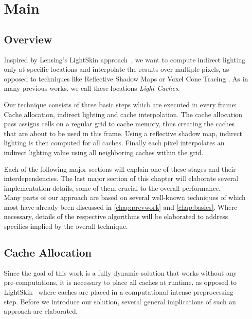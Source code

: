 \documentclass[thesis.tex]{subfiles}
\begin{document}
\chapter{Main}\label{chap:basics}

\section{Overview}
Inspired by Lensing's LightSkin approach~\cite{bib:LightskinPaper}, we want to compute indirect lighting only at specific locations and interpolate the results over multiple pixels, as opposed to techniques like Reflective Shadow Maps or Voxel Cone Tracing .
As in many previous works, we call these locations \emph{Light Caches}.

Our technique consists of three basic steps which are executed in every frame: Cache allocation, indirect lighting and cache interpolation.
The cache allocation pass assigns cells on a regular grid to cache memory, thus creating the caches that are about to be used in this frame.
Using a reflective shadow map, indirect lighting is then computed for all caches.
Finally each pixel interpolates an indirect lighting value using all neighboring caches within the grid.

Each of the following major sections will explain one of these stages and their interdependencies.
The last major section of this chapter will elaborate several implementation details, some of them crucial to the overall performance.\\
Many parts of our approach are based on several well-known techniques of which most have already been discussed in \autoref{chap:prevwork} and \autoref{chap:basics}.
Where necessary, details of the respective algorithms will be elaborated to address specifics implied by the overall technique.

\section{Cache Allocation}
Since the goal of this work is a fully dynamic solution that works without any pre-computations, it is necessary to place all caches at runtime, as opposed to LightSkin~\cite{bib:LightskinPaper} where caches are placed in a computational intense preprocessing step.
Before we introduce our solution, several general implications of such an approach are elaborated.
\end{document}
